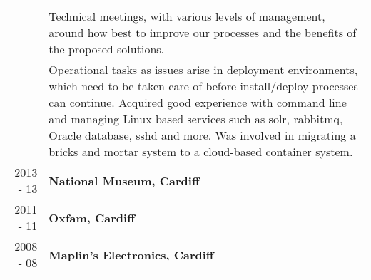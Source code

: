\documentclass[a4paper,12pt,final,sans]{memoir}
\begin{document}
\begin{longtable}{r p{16cm}}
	& Technical meetings, with various levels of management, around how best to improve our processes and the benefits of the proposed solutions. \\[0.4em]

	& Operational tasks as issues arise in deployment environments, which need to be taken care of before install/deploy processes can continue. Acquired good experience with command line and managing Linux based services such as solr, rabbitmq, Oracle database, sshd and more. Was involved in migrating a bricks and mortar system to a cloud-based container system.
\\[0.5em]

2013 - 13 & \textbf{\textsf{\color{head} National Museum, Cardiff}}\\[0.3em]

2011 - 11 & \textbf{\textsf{\color{head} Oxfam, Cardiff}}\\[0.3em]

2008 - 08 & \textbf{\textsf{\color{head} Maplin’s Electronics, Cardiff}}\\[0.3em]
\end{longtable}

\vspace{-0.5mm}
\end{document}
